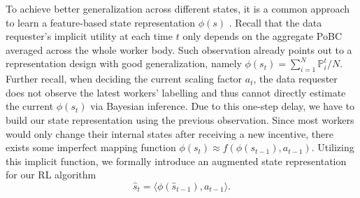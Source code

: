 \vspace{-2mm}
To achieve better generalization across different states, it is a common approach to learn a feature-based state representation $\phi(s)$ \citep{Mnih15, Liang16}. Recall that the data requester's implicit utility at each time $t$ only depends on the aggregate PoBC averaged across the whole worker body. Such observation already points out to a  representation design with good generalization, namely 
$\phi(s_t) = {\sum}_{i=1}^N \mathbb{P}^t_i/N$.
Further recall, when deciding the current scaling factor $a_t$, the data requester does not observe the latest workers' labelling and thus cannot directly estimate the current $\phi(s_t)$ via Bayesian inference. Due to this one-step delay, we have to build our state representation using the previous observation. Since most workers would only change their internal states after receiving a new incentive, there exists some imperfect mapping function $\phi(s_{t}) \approx f(\phi(s_{t-1}),a_{t-1})$. %
Utilizing this implicit function, we formally introduce an augmented state representation for our RL algorithm
$$\hat{s}_t = \langle \phi(\hat{s}_{t-1}), a_{t-1} \rangle.$$

